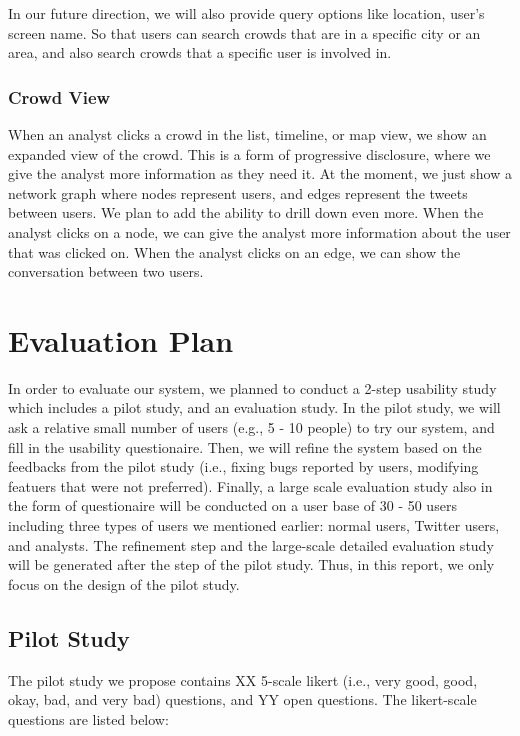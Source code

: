 \documentclass{sig-alternate}
\begin{document}
In our future direction, we will also provide query options like location, user's
screen name. So that users can search crowds that are in a specific city or an 
area, and also search crowds that a specific user is involved in.

\subsubsection{Crowd View}
When an analyst clicks a crowd in the list, timeline, or map view, we show an
expanded view of the crowd. This is a form of progressive disclosure, where we
give the analyst more information as they need it.  At the moment, we just show
a network graph where nodes represent users, and edges represent the tweets
between users. We plan to add the ability to drill down even more.  When the
analyst clicks on a node, we can give the analyst more information about the
user that was clicked on. When the analyst clicks on an edge, we can show the
conversation between two users.

\section{Evaluation Plan}
In order to evaluate our system, we planned to conduct a 2-step usability study
which includes a pilot study, and an evaluation study. In the pilot study, we
will ask a relative small number of users (e.g., 5 - 10 people) to try our
system, and fill in the usability questionaire. Then, we will refine the system
based on the feedbacks from the pilot study (i.e., fixing bugs reported by users,
modifying featuers that were not preferred). Finally, a large scale evaluation
study also in the form of questionaire will be conducted on a user base of 30 -
50 users including three types of users we mentioned earlier: normal users, 
Twitter users, and analysts. The refinement step and the large-scale detailed
evaluation study will be generated after the step of the pilot study. Thus, in
this report, we only focus on the design of the pilot study.

\subsection{Pilot Study}

The pilot study we propose contains XX 5-scale likert (i.e., very good, good,
okay, bad, and very bad) questions, and YY open questions. The likert-scale questions
are listed below:
\end{document}
